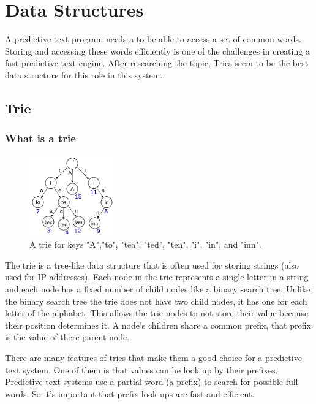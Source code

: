 \documentclass[10pt]{article} %
\begin{document}
	\section{Data Structures}
		A predictive text program needs a to be able to access a set of common words.
		 Storing and accessing these words efficiently is one of the challenges in creating a fast predictive text engine.
		  After researching the topic, Tries seem to be the best data structure for this role in this system.\cite{book:ADS:trie}.
		  
		\subsection{Trie}
			\subsubsection{What is a trie}
			
				\begin{figure} %
    				\centering
    				\includegraphics[width=0.33\textwidth]{Trie_example}
    				\caption{A trie for keys "A","to", "tea", "ted", "ten", "i", "in", and "inn"\cite{fig:Trie_example}.}
    				\label{fig:Trie_example}
				\end{figure}
				
				The trie is a tree-like data structure that is often used for storing strings (also used for IP addresses). Each node in the trie represents a single letter in a string and each node has a fixed number of child nodes like a binary search tree. Unlike the binary search tree the trie does not have two child nodes, it has one for each letter of the alphabet. This allows the trie nodes to not store their value because their position determines it. A node's children share a common prefix, that prefix is the value of there parent node.

                There are many features of tries that make them a good choice for a predictive text system. One of them is that values can be look up by their prefixes. Predictive text systems use a partial word (a prefix) to search for possible full words. So it's important that prefix look-ups are fast and efficient. 
				
\end{document}
